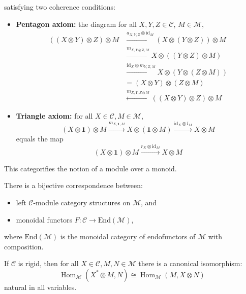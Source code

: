 \documentclass[11pt]{article}
\theoremstyle{definition}
\begin{document}
satisfying two coherence conditions:
\begin{itemize}
  \item \textbf{Pentagon axiom:} the diagram for all \( X,Y,Z \in \mathcal{C} \), \( M \in \mathcal{M} \),
  \[
  \begin{aligned}
  ((X \otimes Y) \otimes Z) \otimes M &\xrightarrow{a_{X,Y,Z} \otimes \mathrm{id}_M} (X \otimes (Y \otimes Z)) \otimes M \\
  &\xrightarrow{m_{X,Y \otimes Z,M}} X \otimes ((Y \otimes Z) \otimes M) \\
  &\xrightarrow{\mathrm{id}_X \otimes m_{Y,Z,M}} X \otimes (Y \otimes (Z \otimes M)) \\
  &= (X \otimes Y) \otimes (Z \otimes M) \\
  &\xleftarrow{m_{X,Y,Z \otimes M}} ((X \otimes Y) \otimes Z) \otimes M
  \end{aligned}
  \]

  \item \textbf{Triangle axiom:} for all \( X \in \mathcal{C}, M \in \mathcal{M} \),
  \[
  (X \otimes \mathbf{1}) \otimes M \xrightarrow{m_{X, \mathbf{1}, M}} X \otimes (\mathbf{1} \otimes M) \xrightarrow{\mathrm{id}_X \otimes l_M} X \otimes M
  \]
  equals the map
  \[
  (X \otimes \mathbf{1}) \otimes M \xrightarrow{r_X \otimes \mathrm{id}_M} X \otimes M
  \]
\end{itemize}

This categorifies the notion of a module over a monoid.

There is a bijective correspondence between:
\begin{itemize}
  \item left \( \mathcal{C} \)-module category structures on \( \mathcal{M} \), and
  \item monoidal functors \( F : \mathcal{C} \to \mathrm{End}(\mathcal{M}) \),
\end{itemize}
where \( \mathrm{End}(\mathcal{M}) \) is the monoidal category of endofunctors of \( \mathcal{M} \) with composition.

If \( \mathcal{C} \) is rigid, then for all \( X \in \mathcal{C}, M,N \in \mathcal{M} \) there is a canonical isomorphism:
\[
\operatorname{Hom}_{\mathcal{M}}(X^* \otimes M, N) \cong \operatorname{Hom}_{\mathcal{M}}(M, X \otimes N)
\]
natural in all variables.
\end{document}
